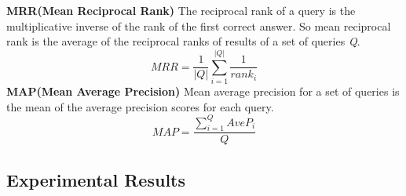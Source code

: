 \documentclass{sig-alternate}
\begin{document}
\textbf{MRR(Mean Reciprocal Rank)}
The reciprocal rank of a query is the multiplicative inverse of the rank of the first correct answer. So mean reciprocal rank is the average of the reciprocal ranks of results of a set of queries \textit{Q}.
\begin{equation}
MRR=\frac{1}{\left | Q \right |}\sum_{i=1}^{\left | Q \right |}\frac{1}{rank_{i}}
\end{equation}
\textbf{MAP(Mean Average Precision)}
Mean average precision for a set of queries is the mean of the average precision scores for each query.
\begin{equation}
MAP=\frac{\sum_{i=1}^{Q}AveP_{i}}{Q}
\end{equation}
\subsection{Experimental Results}
\begin{table}[!t]
\caption{The Performance for Top 1, Top 5 and Top 10 for TF-IDF based approach}
\label{tab:EXP1}
\centering
{}
\end{table}
\end{document}
